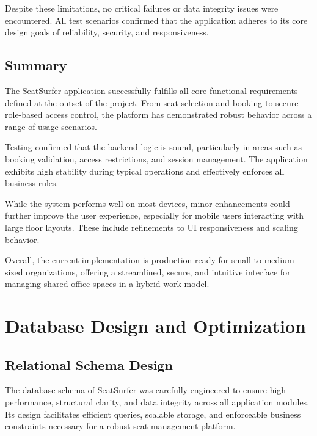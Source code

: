 \documentclass[12pt,a4paper]{report}
\begin{document}
Despite these limitations, no critical failures or data integrity issues were encountered. All test scenarios confirmed that the application adheres to its core design goals of reliability, security, and responsiveness.

\section{Summary}

The SeatSurfer application successfully fulfills all core functional requirements defined at the outset of the project. From seat selection and booking to secure role-based access control, the platform has demonstrated robust behavior across a range of usage scenarios.

Testing confirmed that the backend logic is sound, particularly in areas such as booking validation, access restrictions, and session management. The application exhibits high stability during typical operations and effectively enforces all business rules.

While the system performs well on most devices, minor enhancements could further improve the user experience, especially for mobile users interacting with large floor layouts. These include refinements to UI responsiveness and scaling behavior.

Overall, the current implementation is production-ready for small to medium-sized organizations, offering a streamlined, secure, and intuitive interface for managing shared office spaces in a hybrid work model.

\newpage

\chapter{Database Design and Optimization}

\section{Relational Schema Design}

The database schema of SeatSurfer was carefully engineered to ensure high performance, structural clarity, and data integrity across all application modules. Its design facilitates efficient queries, scalable storage, and enforceable business constraints necessary for a robust seat management platform.
\end{document}
